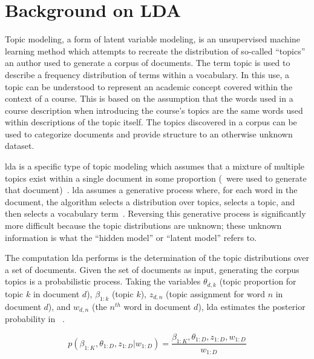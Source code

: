 \section{Background on LDA}
\label{sec:background}


Topic modeling, a form of latent variable modeling, is an unsupervised machine learning method which attempts to recreate the distribution of so-called ``topics'' an author used to generate a corpus of documents.
The term topic is used to describe a frequency distribution of terms within a vocabulary.
In this use, a topic can be understood to represent an academic concept covered within the context of a course.
This is based on the assumption that the words used in a course description when introducing the course's topics are the same words used within descriptions of the topic itself.
The topics discovered in a corpus can be used to categorize documents and provide structure to an otherwise unknown dataset.


\acf{lda} is a specific type of topic modeling which assumes that a mixture of multiple topics exist within a single document in some proportion (\ie\ were used to generate that document)~\cite{Blei2003}.
\ac{lda} assumes a generative process where, for each word in the document, the algorithm selects a distribution over topics, selects a topic, and then selects a vocabulary term~\cite{Blei2003}.
Reversing this generative process is significantly more difficult because the topic distributions are unknown; these unknown information is what the ``hidden model'' or ``latent model'' refers to.


The computation \ac{lda} performs is the determination of the topic distributions over a set of documents.
Given the set of documents as input, generating the corpus topics is a probabilistic process.
Taking the variables $\theta_{d,k}$ (topic proportion for topic $k$ in document $d$), $\beta_{1:k}$ (topic $k$), $z_{d,n}$ (topic assignment for word $n$ in document $d$), and $w_{d,n}$ (the $n^{th}$ word in document $d$), \ac{lda} estimates the posterior probability in ~\cite{Blei2012}.


\begin{equation}
p(\beta_{1:K}, \theta_{1:D},z_{1:D} | w_{1:D}) = \frac{\beta_{1:K},
\theta_{1:D},z_{1:D}, w_{1:D}}{w_{1:D}}
\label{eq:posterior}
\end{equation}


